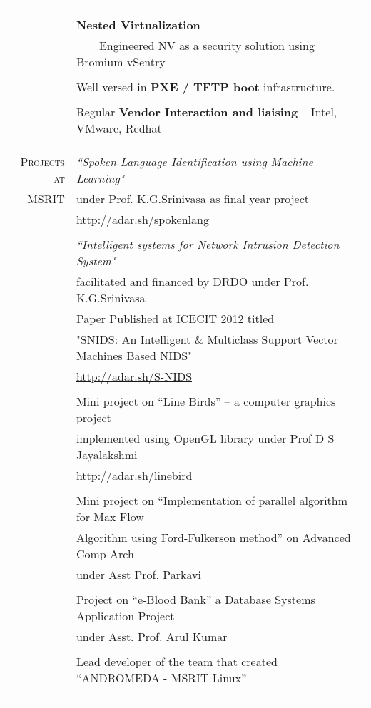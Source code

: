 \documentclass[a4paper,10pt]{article} %
\newcommand{\tabitem}{~~\llap{\textbullet}~~}
\begin{document}
\begin{tabular}{rl}
& \\
&\\
& \textbf{Nested Virtualization} \\
& \tabitem Engineered NV as a security solution using Bromium vSentry \\
& \\
& Well versed in \textbf{PXE / TFTP boot} infrastructure. \\
& \\
& Regular \textbf{Vendor Interaction and liaising} – Intel, VMware, Redhat \\
&\\
&\\
&\\
\textsc{Projects at} & \textit{“Spoken Language Identification using Machine Learning"}\\ 
\textsc{MSRIT} & under Prof. K.G.Srinivasa as final year project\\
& \href{http://adar.sh/spokenlang}{http://adar.sh/spokenlang}\\
& \\
& \textit{“Intelligent systems for Network Intrusion Detection System"} \\ 
& facilitated and financed by DRDO under Prof. K.G.Srinivasa\\
& Paper Published at ICECIT 2012 titled \\
& "SNIDS: An Intelligent \& Multiclass Support Vector Machines Based NIDS" \\
& \href{http://adar.sh/S-NIDS}{http://adar.sh/S-NIDS} \\
& \\
& Mini project on “Line Birds” – a computer graphics project \\
& implemented using OpenGL library under Prof D S Jayalakshmi \\
& \href{http://adar.sh/linebird}{http://adar.sh/linebird}\\
& \\
& Mini project on “Implementation of parallel algorithm for Max Flow \\
& Algorithm using Ford-Fulkerson method” on Advanced Comp Arch \\
& under Asst Prof. Parkavi \\
& \\
& Project on “e-Blood Bank” a Database Systems Application Project \\
& under Asst. Prof. Arul Kumar \\
& \\
& Lead developer of the team that created “ANDROMEDA - MSRIT Linux” \\
& \\
& \\
& \\
\end{tabular}
\end{document}
